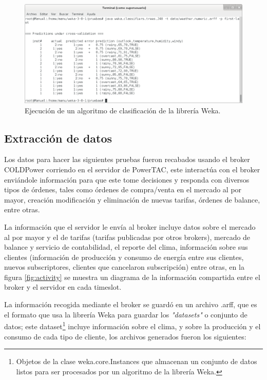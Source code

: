 \begin{figure}[h]
	\centering
	\includegraphics[width=13cm]{img/ejecucionAlgoritmoClasificacion.png}
	\caption{Ejecución de un algoritmo de clasificación de la librería Weka.}
	\label{fig:ejecucionAlgoritmoClasificacion}
\end{figure}

\subsection{Extracción de datos} 
\label{subsec:extraccion}
Los datos para hacer las siguientes pruebas fueron recabados usando el broker COLDPower corriendo en el servidor de PowerTAC, este interactúa con el broker enviándole información para que este tome decisiones y responda con diversos tipos de órdenes, tales como órdenes de compra/venta en el mercado al por mayor, creación modificación y eliminación de nuevas tarifas, órdenes de balance, entre otras. 

La información que el servidor le envía al broker incluye datos sobre el mercado al por mayor y el de tarifas 
(tarifas publicadas por otros brokers), mercado de balance y servicio de contabilidad, el reporte del clima,
información sobre sus clientes (información de producción y consumo de energía entre sus clientes, nuevos subscriptores, clientes que cancelaron subscripción) entre otras, en la figura \ref{fig:activity} se muestra un diagrama de la información compartida entre el broker y el servidor en cada timeslot.

La información recogida mediante el broker se guardó en un archivo .arff, que es el formato que usa la librería Weka para guardar los \textit{"datasets"} o conjunto de datos; este dataset\footnote{Objetos de la clase weka.core.Instances que almacenan un conjunto de datos listos para ser procesados por un algoritmo de la librería Weka.} incluye información sobre el clima, y sobre la producción y el consumo de cada tipo de cliente, los archivos generados fueron los siguientes: \\

